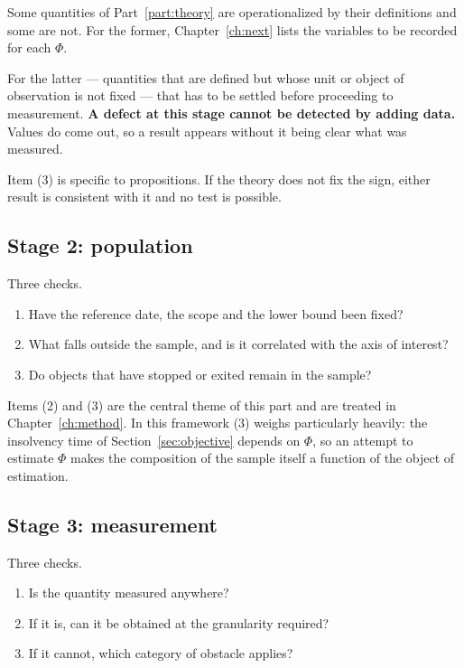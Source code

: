 Some quantities of Part~\ref{part:theory} are operationalized by their definitions and some
are not. For the former, Chapter~\ref{ch:next} lists the variables to be recorded for each
$\Phi$.

For the latter --- quantities that are defined but whose unit or object of observation is
not fixed --- that has to be settled before proceeding to measurement.
\textbf{A defect at this stage cannot be detected by adding data.} Values do come out, so a
result appears without it being clear what was measured.

Item (3) is specific to propositions. If the theory does not fix the sign, either result is
consistent with it and no test is possible.

\subsection{Stage 2: population}

Three checks.

\begin{enumerate}[label=(\arabic*)]
\item Have the reference date, the scope and the lower bound been fixed?
\item What falls outside the sample, and is it correlated with the axis of interest?
\item Do objects that have stopped or exited remain in the sample?
\end{enumerate}

Items (2) and (3) are the central theme of this part and are treated in
Chapter~\ref{ch:method}. In this framework (3) weighs particularly heavily: the insolvency
time of Section~\ref{sec:objective} depends on $\Phi$, so an attempt to estimate $\Phi$
makes the composition of the sample itself a function of the object of estimation.

\subsection{Stage 3: measurement}

Three checks.

\begin{enumerate}[label=(\arabic*)]
\item Is the quantity measured anywhere?
\item If it is, can it be obtained at the granularity required?
\item If it cannot, which category of obstacle applies?
\end{enumerate}

